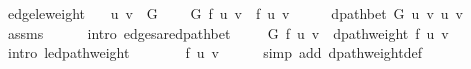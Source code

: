 \begin{isabellebody}
\endisatagproof
{\isafoldproof}%
%
\isadelimproof
\isanewline
%
\endisadelimproof
%
\isadeliminvisible
\isanewline
%
\endisadeliminvisible
%
\isataginvisible
{}\isamarkupfalse%
\ {\isasymdelta}{\isacharunderscore}{\kern0pt}edge{\isacharunderscore}{\kern0pt}le{\isacharunderscore}{\kern0pt}weight{\isacharcolon}{\kern0pt}\isanewline
\ \ \ {\isachardoublequoteopen}{\isacharparenleft}{\kern0pt}u{\isacharcomma}{\kern0pt}\ v{\isacharparenright}{\kern0pt}\ {\isasymin}\ G{\isachardoublequoteclose}\isanewline
\ \ \ {\isachardoublequoteopen}{\isasymdelta}\ G\ f\ u\ v\ {\isasymle}\ f\ {\isacharparenleft}{\kern0pt}u{\isacharcomma}{\kern0pt}\ v{\isacharparenright}{\kern0pt}{\isachardoublequoteclose}%
\endisataginvisible
{\isafoldinvisible}%
%
\isadeliminvisible
\isanewline
%
\endisadeliminvisible
%
\isadelimproof
%
\endisadelimproof
%
\isatagproof
{}\isamarkupfalse%
\ {\isacharminus}{\kern0pt}\isanewline
\ \ \isamarkupfalse%
\ {\isachardoublequoteopen}dpath{\isacharunderscore}{\kern0pt}bet\ G\ {\isacharbrackleft}{\kern0pt}u{\isacharcomma}{\kern0pt}\ v{\isacharbrackright}{\kern0pt}\ u\ v{\isachardoublequoteclose}\isanewline
\ \ \ \ \isamarkupfalse%
\ assms\isanewline
\ \ \ \ \isamarkupfalse%
\ {\isacharparenleft}{\kern0pt}intro\ edges{\isacharunderscore}{\kern0pt}are{\isacharunderscore}{\kern0pt}dpath{\isacharunderscore}{\kern0pt}bet{\isacharparenright}{\kern0pt}\isanewline
\ \ \isamarkupfalse%
\ {\isachardoublequoteopen}{\isasymdelta}\ G\ f\ u\ v\ {\isasymle}\ dpath{\isacharunderscore}{\kern0pt}weight\ f\ {\isacharbrackleft}{\kern0pt}u{\isacharcomma}{\kern0pt}\ v{\isacharbrackright}{\kern0pt}{\isachardoublequoteclose}\isanewline
\ \ \ \ \isamarkupfalse%
\ {\isacharparenleft}{\kern0pt}intro\ {\isasymdelta}{\isacharunderscore}{\kern0pt}le{\isacharunderscore}{\kern0pt}dpath{\isacharunderscore}{\kern0pt}weight{\isacharparenright}{\kern0pt}\isanewline
\ \ \isamarkupfalse%
\ \isamarkupfalse%
\ {\isachardoublequoteopen}{\isachardot}{\kern0pt}{\isachardot}{\kern0pt}{\isachardot}{\kern0pt}\ {\isacharequal}{\kern0pt}\ f\ {\isacharparenleft}{\kern0pt}u{\isacharcomma}{\kern0pt}\ v{\isacharparenright}{\kern0pt}{\isachardoublequoteclose}\isanewline
\ \ \ \ \isamarkupfalse%
\ {\isacharparenleft}{\kern0pt}simp\ add{\isacharcolon}{\kern0pt}\ dpath{\isacharunderscore}{\kern0pt}weight{\isacharunderscore}{\kern0pt}def{\isacharparenright}{\kern0pt}\isanewline
\ \ \isamarkupfalse%

\end{isabellebody}

